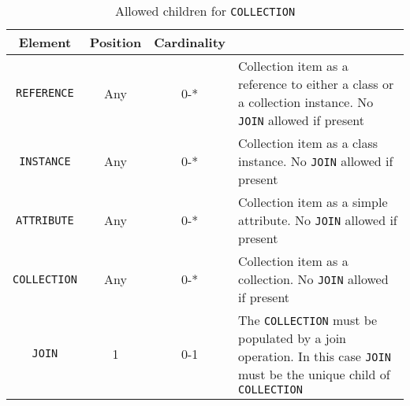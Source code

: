 \begin{table}[!htbp]
\small
\centering
\begin{tabulary}{\linewidth}{|c |c |c|J|}
    \hline 
        \textbf{Element} &
        \textbf{Position} &
        \textbf{Cardinality} &
        \\
    \hline      \hline  
        \texttt{REFERENCE}  &        
        Any &           
        0-* &
        Collection item as a reference to either a class or a collection instance. No \texttt{JOIN} allowed if present\\
    \hline    
        \texttt{INSTANCE} &           
        Any &           
        0-* &
        Collection item as a class instance. No \texttt{JOIN} allowed if present\\
    \hline    
        \texttt{ATTRIBUTE} &           
        Any &           
        0-* &
        Collection item as a simple attribute. No \texttt{JOIN} allowed if present\\
    \hline    
        \texttt{COLLECTION} &           
        Any &           
        0-* &
        Collection item as a collection. No \texttt{JOIN} allowed if present\\
    \hline    
        \texttt{JOIN} &           
        1 &           
        0-1 &
        The \texttt{COLLECTION} must be populated by a join operation. In this case \texttt{JOIN} must be the unique child of \texttt{COLLECTION} \\
    \hline 
\end{tabulary}
     \caption{Allowed children for \texttt{COLLECTION}} 
     \label{tbl:collection-chilren}
 \end{table}
